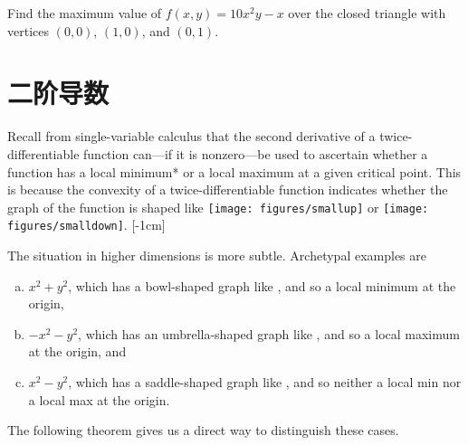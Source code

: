 \documentclass[indent]{watsonbook}
\begin{document}
{\begin{exercise}{}{}
  Find the maximum value of $f(x,y) = 10x^2y-x$ over the closed
  triangle with vertices $(0,0)$, $(1,0)$, and $(0,1)$.
\end{exercise}

\section{二阶导数} \label{sec:second_test}

Recall from single-variable calculus that the second derivative of a
twice-differentiable function can---if it is nonzero---be used to
ascertain whether a function has a local minimum* or a local maximum
at a given critical point. This is because the convexity of a
twice-differentiable function indicates whether the graph of the
function is shaped like \texttt{[image: figures/smallup]} or
\texttt{[image: figures/smalldown]}. [-1cm]

The situation in higher dimensions is more subtle. Archetypal
examples are
\begin{enumerate}[(a),topsep=-6pt,itemsep=4pt]
\item $x^2 + y^2$, which has a bowl-shaped graph like
  , and so a local
  minimum at the origin,
\item $-x^2 - y^2$, which has an umbrella-shaped graph like
  , and so a
  local maximum at the origin, and
\item $x^2 - y^2$, which has a saddle-shaped graph like
  , and so
  neither a local min nor a local max at the origin.
\end{enumerate}

The following theorem gives us a direct way to distinguish these
cases.

\newcommand\secondderivativetest{
  Suppose that $U$ is an open set in $\R^2$ and $f:U \to \R$ is a
  twice-differentiable function with a critical point at $(a,b)$. We
  define
  $D = (\partial_{x}^2f \, \partial_{y}^2f-[\partial_x\partial_y
  f]^2)(a,b)$. Then* \sidenote{* When $D=0$, this theorem doesn't tell us
    anything}
  \begin{enumerate}[(a),itemsep=4pt]
  \item if $D > 0$ and $(\partial_x^2 f)(a,b) > 0$, then $f$ has a
    local minimum at $(a,b)$,
  \item if $D > 0$ and $(\partial_x^2 f)(a,b) < 0$, then $f$ has a
    local maximum at $(a,b)$, and
  \item if $D < 0$, then $f$ has a saddle point at $(a,b)$.
  \end{enumerate}
}

}
\end{document}
